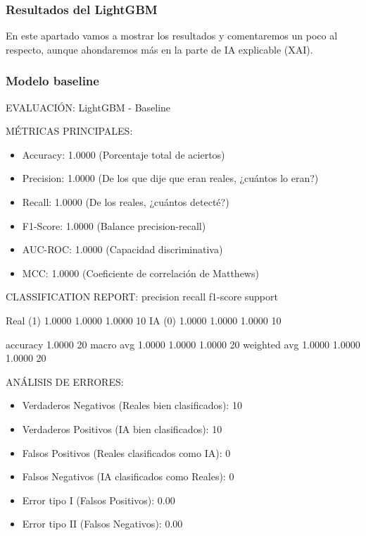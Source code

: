 \subsubsection*{Resultados del LightGBM}

En este apartado vamos a mostrar los resultados y comentaremos un poco  al respecto, aunque ahondaremos más en la parte de IA explicable (XAI).

\subsubsection*{Modelo baseline}

EVALUACIÓN: LightGBM - Baseline

MÉTRICAS PRINCIPALES:
\begin{itemize}
	\item Accuracy:  1.0000  (Porcentaje total de aciertos)
	\item Precision: 1.0000  (De los que dije que eran reales, ¿cuántos lo eran?)
	\item Recall:    1.0000  (De los reales, ¿cuántos detecté?)
	\item F1-Score:  1.0000  (Balance precision-recall)
	\item AUC-ROC:   1.0000  (Capacidad discriminativa)
	\item MCC:       1.0000  (Coeficiente de correlación de Matthews)
\end{itemize}

CLASSIFICATION REPORT:
              precision    recall  f1-score   support

    Real (1)     1.0000    1.0000    1.0000        10
      IA (0)     1.0000    1.0000    1.0000        10

    accuracy                         1.0000        20
   macro avg     1.0000    1.0000    1.0000        20
weighted avg     1.0000    1.0000    1.0000        20


ANÁLISIS DE ERRORES:
\begin{itemize}
	\item Verdaderos Negativos (Reales bien clasificados): 10
	\item Verdaderos Positivos (IA bien clasificados): 10
	\item Falsos Positivos (Reales clasificados como IA): 0
	\item Falsos Negativos (IA clasificados como Reales): 0
	\item Error tipo I (Falsos Positivos): 0.00%
	\item Error tipo II (Falsos Negativos): 0.00%
\end{itemize}

